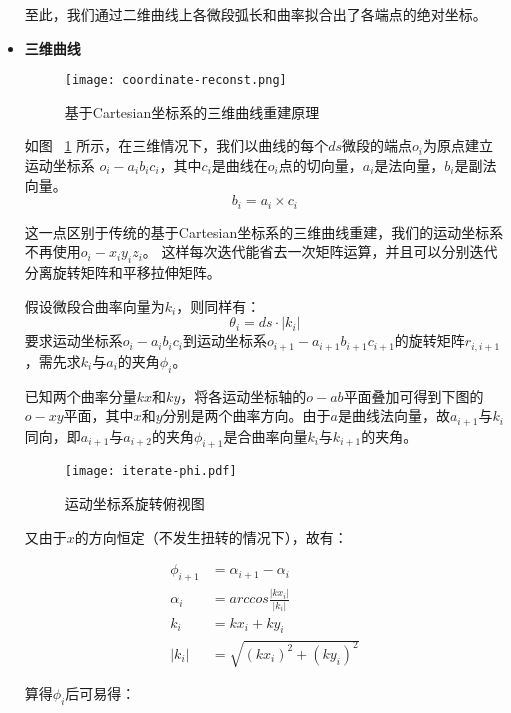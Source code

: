 \begin{itemize}
至此，我们通过二维曲线上各微段弧长和曲率拟合出了各端点的绝对坐标。

\item \textbf{三维曲线} \\

\begin{figure}[H]
\centering
\texttt{[image: coordinate-reconst.png]}
\caption{基于Cartesian坐标系的三维曲线重建原理}
\label{fig:coordinate-reconst} 
\end{figure}


如图 ~\ref{fig:coordinate-reconst} 所示，在三维情况下，我们以曲线的每个$ds$微段的端点$o_i$为原点建立运动坐标系\cite{three-dimensional-curve} $o_i-a_ib_ic_i$，其中$c_i$是曲线在$o_i$点的切向量，$a_i$是法向量，$b_i$是副法向量。
\begin{equation}
b_i = a_i \times c_i
\end{equation}

这一点区别于传统的基于Cartesian坐标系的三维曲线重建，我们的运动坐标系不再使用$o_i-x_iy_iz_i$。
这样每次迭代能省去一次矩阵运算，并且可以分别迭代分离旋转矩阵和平移拉伸矩阵。

假设微段合曲率向量为$k_i$，则同样有：
\begin{equation}
\theta_i = ds\cdot |k_i|
\end{equation}
要求运动坐标系$o_i-a_ib_ic_i$到运动坐标系$o_{i+1}-a_{i+1}b_{i+1}c_{i+1}$的旋转矩阵$r_{i, i+1}$，需先求$k_i$与$a_i$的夹角$\phi_i$。

已知两个曲率分量$kx$和$ky$，将各运动坐标轴的$o-ab$平面叠加可得到下图的$o-xy$平面，其中$x$和$y$分别是两个曲率方向。由于$a$是曲线法向量，故$a_{i+1}$与$k_i$同向，即$a_{i+1}$与$a_{i+2}$的夹角$\phi_{i+1}$是合曲率向量$k_i$与$k_{i+1}$的夹角。

\begin{figure}[H]
\centering
\texttt{[image: iterate-phi.pdf]}
\caption{运动坐标系旋转俯视图}
\label{fig:iterate-phi} 
\end{figure}

又由于$x$的方向恒定（不发生扭转的情况下），故有：

\begin{align}
\phi_{i+1} &= \alpha_{i+1} - \alpha_i \\
\alpha_i &= arccos\frac{|kx_i|}{|k_i|} \\
k_i &= kx_i + ky_i \\
|k_i| &= \sqrt{(kx_i)^2 + (ky_i)^2}
\end{align}

算得$\phi_i$后可易得：


\end{itemize}
